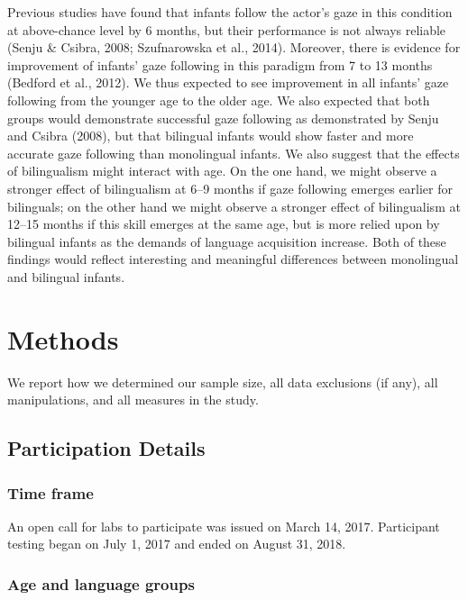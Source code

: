 \documentclass[,man,floatsintext]{apa6}
\begin{document}
Previous studies have found that infants follow the actor's gaze in this condition at above-chance level by 6 months, but their performance is not always reliable (Senju \& Csibra, 2008; Szufnarowska et al., 2014). Moreover, there is evidence for improvement of infants' gaze following in this paradigm from 7 to 13 months (Bedford et al., 2012). We thus expected to see improvement in all infants' gaze following from the younger age to the older age. We also expected that both groups would demonstrate successful gaze following as demonstrated by Senju and Csibra (2008), but that bilingual infants would show faster and more accurate gaze following than monolingual infants. We also suggest that the effects of bilingualism might interact with age. On the one hand, we might observe a stronger effect of bilingualism at 6--9 months if gaze following emerges earlier for bilinguals; on the other hand we might observe a stronger effect of bilingualism at 12--15 months if this skill emerges at the same age, but is more relied upon by bilingual infants as the demands of language acquisition increase. Both of these findings would reflect interesting and meaningful differences between monolingual and bilingual infants.

\hypertarget{methods}{%
\section{Methods}\label{methods}}

We report how we determined our sample size, all data exclusions (if any), all manipulations, and all measures in the study.

\hypertarget{participation-details}{%
\subsection{Participation Details}\label{participation-details}}

\hypertarget{time-frame}{%
\subsubsection{Time frame}\label{time-frame}}

An open call for labs to participate was issued on March 14, 2017. Participant testing began on July 1, 2017 and ended on August 31, 2018.

\hypertarget{age-and-language-groups}{%
\subsubsection{Age and language groups}\label{age-and-language-groups}}
\end{document}
